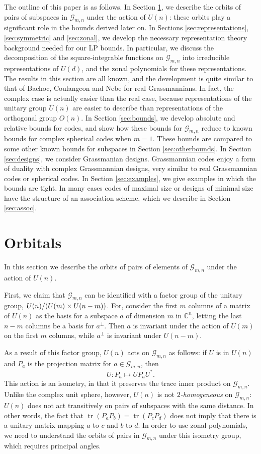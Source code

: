 \documentclass[12pt]{article}
\numberwithin{equation}{section}
\theoremstyle{plainsl}
\newcommand\defn[1]{\textsl{#1}}
\newcommand\cx{{\mathbb C}}%
\newcommand\gras[2]{\mathcal{G}_{#1,#2}}
\newcommand\opk[1]{\mathop{\mathrm{#1}}\nolimits}
\newcommand\tr{\opk{tr}}
\begin{document}
The outline of this paper is as follows. In Section \ref{sec:orbitals}, we describe the orbits of pairs of subspaces in $\gras{m}{n}$ under the action of $U(n)$: these orbits play a significant role in the bounds derived later on. In Sections \ref{sec:representations}, \ref{sec:symmetric} and \ref{sec:zonal}, we develop the necessary representation theory background needed for our LP bounds. In particular, we discuss the decomposition of the square-integrable functions on $\gras{m}{n}$ into irreducible representations of $U(d)$, and the zonal polynomials for these representations. The results in this section are all known, and the development is quite similar to that of Bachoc, Coulangeon and Nebe for real Grassmannians. In fact, the complex case is actually easier than the real case, because representations of the unitary group $U(n)$ are easier to describe than representations of the orthogonal group $O(n)$. In Section \ref{sec:bounds}, we develop absolute and relative bounds for codes, and show how these bounds for $\gras{m}{n}$ reduce to known bounds for complex spherical codes when $m = 1$. These bounds are compared to some other known bounds for subspaces in Section \ref{sec:otherbounds}. In Section \ref{sec:designs}, we consider Grassmanian designs. Grassmannian codes enjoy a form of duality with complex Grassmannian designs, very similar to real Grassmannian codes or spherical codes. In Section \ref{sec:examples}, we give examples in which the bounds are tight. In many cases codes of maximal size or designs of minimal size have the structure of an association scheme, which we describe in Section \ref{sec:assoc}.

\section{Orbitals}
\label{sec:orbitals}

In this section we describe the orbits of pairs of elements of $\gras{m}{n}$ under the action of $U(n)$. 

First, we claim that $\gras{m}{n}$ can be identified with a factor group of the unitary group, $\nobreak{U(n)/(U(m) \times U(n-m))}$. For, consider the first $m$ columns of a matrix of $U(n)$ as the basis for a subspace $a$ of dimension $m$ in $\cx^n$, letting the last $n-m$ columns be a basis for $a^{\perp}$. Then $a$ is invariant under the action of $U(m)$ on the first $m$ columns, while $a^{\perp}$ is invariant under $U(n-m)$. 

As a result of this factor group, $U(n)$ acts on $\gras{m}{n}$ as follows: if $U$ is in $U(n)$ and $P_a$ is the projection matrix for $a \in \gras{m}{n}$, then 
\[
U: P_a \mapsto UP_aU^*.
\]
This action is an isometry, in that it preserves the trace inner product on $\gras{m}{n}$. Unlike the complex unit sphere, however, $U(n)$ is not \defn{$2$-homogeneous} on $\gras{m}{n}$: $U(n)$ does not act transitively on pairs of subspaces with the same distance. In other words, the fact that $\tr(P_aP_b) = \tr(P_cP_d)$ does not imply that there is a unitary matrix mapping $a$ to $c$ and $b$ to $d$. In order to use zonal polynomials, we need to understand the orbits of pairs in $\gras{m}{n}$ under this isometry group, which requires principal angles. 
\end{document}
